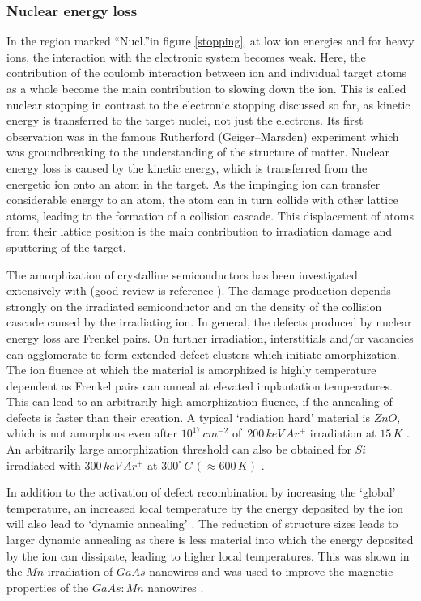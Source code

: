 \subsubsection{Nuclear energy loss}

In the region marked ``Nucl.''in figure \ref{stopping}, at low ion energies and for heavy ions, the interaction with the electronic system becomes weak. Here, the contribution of the coulomb interaction between ion and individual target atoms as a whole become the main contribution to slowing down the ion. This is called nuclear stopping in contrast to the electronic stopping discussed so far, as kinetic energy is transferred to the target nuclei, not just the electrons. Its first observation was in the famous Rutherford (Geiger–Marsden) experiment \cite{rutherford_scattering_1911} which was groundbreaking to the understanding of the structure of matter. Nuclear energy loss is caused by the kinetic energy, which is transferred from the energetic ion onto an atom in the target. As the impinging ion can transfer considerable energy to an atom, the atom can in turn collide with other lattice atoms, leading to the formation of a collision cascade. This displacement of atoms from their lattice position is the main contribution to irradiation damage and sputtering of the target. 

The amorphization of crystalline semiconductors has been investigated extensively with (good review is reference \cite{wesch_damage_2012}). The damage production depends strongly on the irradiated semiconductor and on the density of the collision cascade caused by the irradiating ion. In general, the defects produced by nuclear energy loss are Frenkel pairs. On further irradiation, interstitials and/or vacancies can agglomerate to form extended defect clusters which initiate amorphization. The ion fluence at which the material is amorphized is highly temperature dependent as Frenkel pairs can anneal at elevated implantation temperatures. This can lead to an arbitrarily high amorphization fluence, if the annealing of defects is faster than their creation. A typical `radiation hard' material is $ZnO$, which is not amorphous even after $10^{17}\,cm^{-2}$ of $\,200\,keV\,Ar^+$ irradiation at $15\,K$ \cite{wesch_damage_2012}. An arbitrarily large amorphization threshold can also be obtained for $Si$ irradiated with $300\,keV\,Ar^+$ at $300^\circ\,C\,(\approx 600\,K)$ \cite{pelaz_ion-beam-induced_2004}.

In addition to the activation of defect recombination by increasing the `global' temperature, an increased local temperature by the energy deposited by the ion will also lead to `dynamic annealing' \cite{dhara_formation_2007}. The reduction of structure sizes leads to larger dynamic annealing as there is less material into which the energy deposited by the ion can dissipate, leading to higher local temperatures. This was shown in the $Mn$ irradiation of $GaAs$ nanowires \cite{borschel_ion-solid_2012,johannes_ion_2015} and was used to improve the magnetic properties of the $GaAs\! \! :\! \! Mn$ nanowires \cite{borschel_new_2011,paschoal_hopping_2012,kumar_magnetic_2013,paschoal_magnetoresistance_2014}. 

